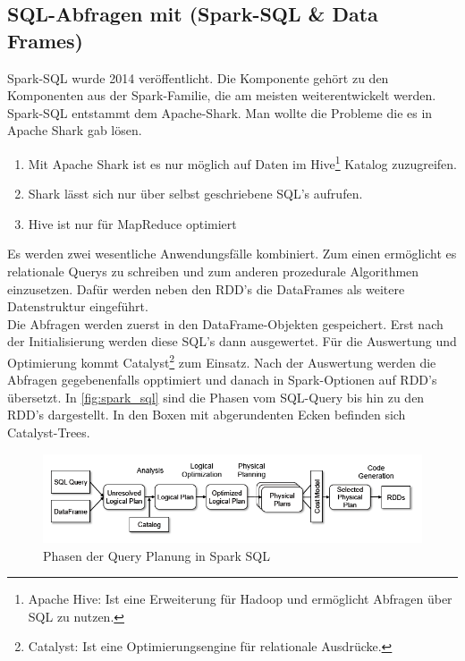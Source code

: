 \newpage
\subsection{SQL-Abfragen mit (Spark-SQL \& Data Frames)}\label{sec_sparksql}

Spark-SQL wurde 2014 veröffentlicht. Die Komponente gehört zu den Komponenten aus der Spark-Familie, die am meisten weiterentwickelt werden.
Spark-SQL entstammt dem Apache-Shark. Man wollte die Probleme die es in Apache Shark gab lösen.
\begin{enumerate}
	\item Mit Apache Shark ist es nur möglich auf Daten im Hive\footnote{Apache Hive: Ist eine Erweiterung für Hadoop und ermöglicht Abfragen über SQL zu nutzen.} Katalog zuzugreifen. 
	\item Shark lässt sich nur über selbst geschriebene SQL's aufrufen. 
	\item Hive ist nur für MapReduce optimiert
\end{enumerate}

\noindent
Es werden zwei wesentliche Anwendungsfälle kombiniert. Zum einen ermöglicht es relationale Querys zu schreiben und zum anderen prozedurale Algorithmen einzusetzen. 
Dafür werden neben den RDD's die DataFrames als weitere Datenstruktur eingeführt.\\

\noindent
Die Abfragen werden zuerst in den DataFrame-Objekten gespeichert. Erst nach der Initialisierung werden diese SQL's dann ausgewertet. Für die Auswertung und Optimierung kommt Catalyst\footnote{Catalyst: Ist eine Optimierungsengine für relationale Ausdrücke.} zum Einsatz. Nach der Auswertung werden die Abfragen gegebenenfalls opptimiert und danach in Spark-Optionen auf RDD's übersetzt. In \autoref{fig:spark_sql} sind die Phasen vom SQL-Query bis hin zu den RDD's dargestellt. In den Boxen mit abgerundenten Ecken befinden sich Catalyst-Trees.

\begin{figure}[h]
  \centering
  \includegraphics[width=\textwidth]{./bilder/spark_sql.png}
  \caption{Phasen der Query Planung in Spark SQL \cite{AXL+15}}\label{fig:spark_sql}
\end{figure}

